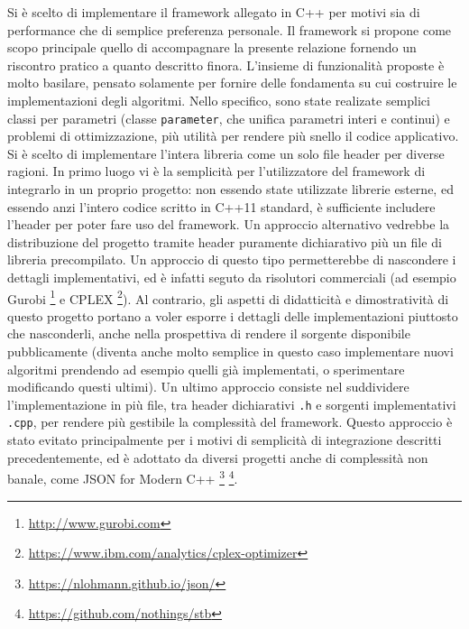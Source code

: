 \documentclass[12pt]{article}
\begin{document}
Si è scelto di implementare il framework allegato in C++ per motivi sia di performance che di semplice preferenza personale. Il framework si propone come scopo principale quello di accompagnare la presente relazione fornendo un riscontro pratico a quanto descritto finora. \newline 
L'insieme di funzionalità proposte è molto basilare, pensato solamente per fornire delle fondamenta su cui costruire le implementazioni degli algoritmi. Nello specifico, sono state realizate semplici classi per parametri (classe \texttt{parameter}, che unifica parametri interi e continui) e problemi di ottimizzazione, più utilità per rendere più snello il codice applicativo.\newline
\newline
Si è scelto di implementare l'intera libreria come un solo file header per diverse ragioni. In primo luogo vi è la semplicità per l'utilizzatore del framework di integrarlo in un proprio progetto: non essendo state utilizzate librerie esterne, ed essendo anzi l'intero codice scritto in C++11 standard, è sufficiente includere l'header per poter fare uso del framework. Un approccio alternativo vedrebbe la distribuzione del progetto tramite header puramente dichiarativo più un file di libreria precompilato. Un approccio di questo tipo permetterebbe di nascondere i dettagli implementativi, ed è infatti seguto da risolutori commerciali (ad esempio Gurobi \footnote{\url{http://www.gurobi.com}} e CPLEX \footnote{\url{https://www.ibm.com/analytics/cplex-optimizer}}). Al contrario, gli aspetti  di didatticità e dimostratività di questo progetto portano a voler esporre i dettagli delle implementazioni piuttosto che nasconderli, anche nella prospettiva di rendere il sorgente disponibile pubblicamente (diventa anche molto semplice in questo caso implementare nuovi algoritmi prendendo ad esempio quelli già implementati, o sperimentare modificando questi ultimi). \newline
Un ultimo approccio consiste nel suddividere l'implementazione in più file, tra header dichiarativi \texttt{.h} e sorgenti implementativi \texttt{.cpp}, per rendere più gestibile la complessità del framework. Questo approccio è stato evitato principalmente per i motivi di semplicità di integrazione descritti precedentemente, ed è adottato da diversi progetti anche di complessità non banale, come JSON for Modern C++ \footnote{\url{https://nlohmann.github.io/json/}} \footnote{\url{https://github.com/nothings/stb}}.\newline
\end{document}
